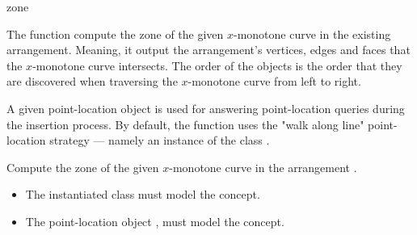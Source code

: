 \ccRefPageBegin

\begin{ccRefFunction}{zone}

\ccDefinition

The function \ccRefName{} compute the zone of the given $x$-monotone
curve in the existing arrangement. Meaning, it output the
arrangement's vertices, edges and faces that the $x$-monotone curve 
intersects. The order of the objects is the order that they are
discovered when traversing the $x$-monotone curve from left to right.

A given point-location object is used for answering point-location queries
during the insertion process. By default, the function uses the
"walk along line" point-location strategy --- namely an instance of the
class .



Compute the zone of the given $x$-monotone curve  in the
arrangement .


\ccRequirements
\begin{itemize}
\item The instantiated  class must model the
   concept. 
\item The point-location object , must model the
   concept.
\end{itemize}

\end{ccRefFunction}

\ccRefPageEnd
